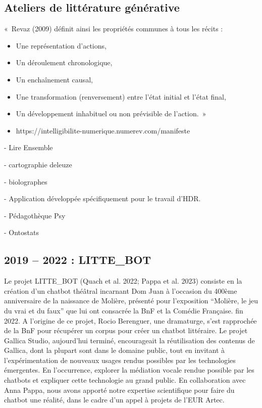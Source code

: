 \documentclass[
  letterpaper,
  DIV=11,
  numbers=noendperiod]{scrreprt}
\providecommand{\tightlist}{%
  \setlength{\itemsep}{0pt}\setlength{\parskip}{0pt}}\usepackage{longtable,booktabs,array}
\begin{document}
\hypertarget{sec-ateliersGenerateur}{%
\subsection{Ateliers de littérature
générative}\label{sec-ateliersGenerateur}}

«~Revaz (2009) définit ainsi les propriétés communes à tous les récits :

\begin{itemize}
\tightlist
\item
  Une représentation d'actions,
\item
  Un déroulement chronologique,
\item
  Un enchaînement causal,
\item
  Une transformation (renversement) entre l'état initial et l'état
  final,
\item
  Un développement inhabituel ou non prévisible de l'action.~»
\item
  https://intelligibilite-numerique.numerev.com/manifeste
\end{itemize}

- Lire Ensemble

- cartographie deleuze

- biolographes

- Application développée spécifiquement pour le travail d'HDR.

- Pédagothèque Psy

- Ontostats

\hypertarget{sec-projetLitteBot}{%
\subsection{2019 -- 2022 : LITTE\_BOT}\label{sec-projetLitteBot}}

Le projet LITTE\_BOT (Quach et al. 2022; Pappa et al. 2023) consiste en
la création d'un chatbot théâtral incarnant Dom Juan à l'occasion du
400ème anniversaire de la naissance de Molière, présenté pour
l'exposition ``Molière, le jeu du vrai et du faux'' que lui ont
consacrée la BnF et la Comédie Française. fin 2022. A l'origine de ce
projet, Rocio Berenguer, une dramaturge, s'est rapprochée de la BnF pour
récupérer un corpus pour créer un chatbot littéraire. Le projet Gallica
Studio, aujourd'hui terminé, encourageait la réutilisation des contenus
de Gallica, dont la plupart sont dans le domaine public, tout en
invitant à l'expérimentation de nouveaux usages rendus possibles par les
technologies émergentes. En l'occurrence, explorer la médiation vocale
rendue possible par les chatbots et expliquer cette technologie au grand
public. En collaboration avec Anna Pappa, nous avons apporté notre
expertise scientifique pour faire du chatbot une réalité, dans le cadre
d'un appel à projets de l'EUR Artec.
\end{document}
